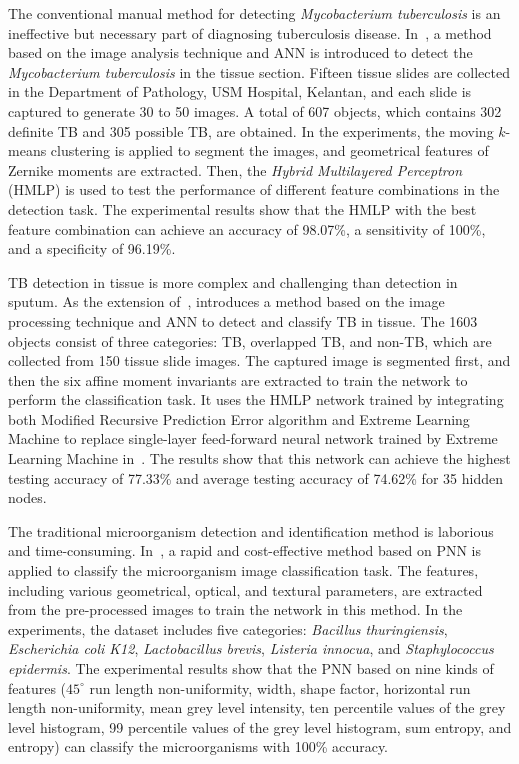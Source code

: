 The conventional manual method for detecting \emph{Mycobacterium tuberculosis} is an ineffective but necessary part of diagnosing tuberculosis disease. In~\cite{Osman-2010-DMTZ}, a method based on the image analysis technique and ANN is introduced to detect the \emph{Mycobacterium tuberculosis} in the tissue section. Fifteen tissue slides are collected in the Department of Pathology, USM Hospital, Kelantan, and each slide is captured to generate 30 to 50 images. A total of 607 objects, which contains 302 definite TB and 305 possible TB, are obtained. In the experiments, the moving $k$-means clustering is applied to segment the images, and geometrical features of Zernike moments are extracted. Then, the \emph{Hybrid Multilayered Perceptron} (HMLP) is used to test the performance of different feature combinations in the detection task. The experimental results show that the HMLP with the best feature combination can achieve an accuracy of 98.07\%, a sensitivity of 100\%, and a specificity of 96.19\%.


TB detection in tissue is more complex and challenging than detection in sputum. As the extension of~\cite{Osman-2011-TBDZ}, \cite{Osman-2011-HMPN} introduces a method based on the image processing technique and ANN to detect and classify TB in tissue. The 1603 objects consist of three categories: TB, overlapped TB, and non-TB, which are collected from 150 tissue slide images. The captured image is segmented first, and then the six affine moment invariants are extracted to train the network to perform the classification task. It uses the HMLP network trained by integrating both Modified Recursive Prediction Error algorithm and Extreme Learning Machine to replace single-layer feed-forward neural network trained by Extreme Learning Machine in~\cite{Osman-2011-TBDZ}. The results show that this network can achieve the highest testing accuracy of 77.33\% and average testing accuracy of 74.62\% for 35 hidden nodes.

The traditional microorganism detection and identification method is laborious and time-consuming. In~\cite{Kumar-2010-RDMU}, a rapid and cost-effective method based on PNN is applied to classify the microorganism image classification task. The features, including various geometrical, optical, and textural parameters, are extracted from the pre-processed images to train the network in this method. In the experiments, the dataset includes five categories: \emph{Bacillus thuringiensis}, \emph{Escherichia coli K12}, \emph{Lactobacillus brevis}, \emph{Listeria innocua}, and \emph{Staphylococcus epidermis}. The experimental results show that the PNN based on nine kinds of features ($45^{\circ}$ run length non-uniformity, width, shape factor, horizontal run length non-uniformity, mean grey level intensity, ten percentile values of the grey level histogram, 99 percentile values of the grey level histogram, sum entropy, and entropy) can classify the microorganisms with 100\% accuracy.


